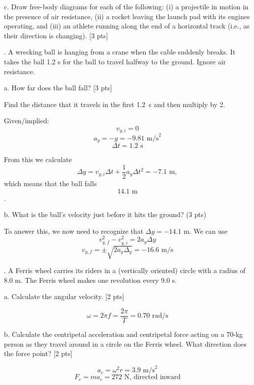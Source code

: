 \documentclass[11pt,letterpaper]{article}
\newcommand{\sol}[1]{{\color{White} #1}} %
\begin{document}
c. Draw free-body diagrams for each of the following: (i) a projectile in motion in the presence of air resistance, (ii) a rocket leaving the launch pad with its engines operating, and (iii) an athlete
running along the end of a horizontal track (i.e., as their direction is changing). [3 pts]



. A wrecking ball is hanging from a crane when the cable suddenly breaks. It takes the ball 1.2 s for the ball
to travel halfway to the ground. Ignore air resistance.

a. How far does the ball fall? [3 pts]

\sol{Find the distance that it travels in the first 1.2~s and then multiply by 2.

Given/implied:
$$v_{y,i}=0$$
$$a_y = -g = -9.81\mbox{ m/s}^2$$
$$\Delta t = 1.2\mbox{ s}$$

From this we calculate
$$\Delta y = v_{y,i}\Delta t + \frac{1}{2}a_y\Delta{t}^2=-7.1\mbox{ m},$$
which means that the ball falls $$\boxed{14.1\mbox{ m}}$$.
}
\vspace{2cm}

b. What is the ball’s velocity just before it hits the ground? (3 pts)

\sol{To answer this, we now need to recognize that $\Delta y=-14.1\mbox{ m}$. We can use
$$v_{y,f}^2 - v_{y,i}^2 = 2a_y\Delta y$$
$$v_{y,f} = \pm \sqrt{2a_y\Delta_y} = \boxed{-16.6\mbox{ m/s}}$$

}



. A Ferris wheel carries its riders in a (vertically oriented) circle with a radius of 8.0 m. The Ferris wheel makes one revolution every 9.0 s. 

a. Calculate the angular velocity. [2 pts]

\sol{$$\omega = 2\pi f = \frac{2\pi}{T} = \boxed{0.70\mbox{ rad/s}}$$}
\vspace{1cm}

b. Calculate the centripetal acceleration and centripetal force acting on a 70-kg person as they travel around in a circle on the Ferris wheel. What direction does the force point? [2 pts]

\sol{
$$a_c = \omega^2r = \boxed{3.9\mbox{ m/s}^2}$$
$$F_c = ma_c = \boxed{272\mbox{ N, directed inward}}$$}
\vspace{1cm}
\end{document}
